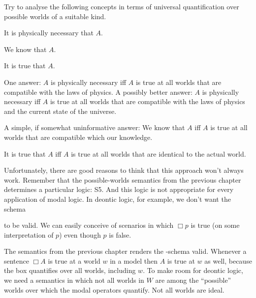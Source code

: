 \begin{exercise}
  Try to analyse the following concepts in terms of universal quantification over possible worlds of a suitable kind.
  \begin{exlist}
    \item It is physically necessary that $A$.
    \item We know that $A$.
    \item It is true that $A$.
  \end{exlist}
\end{exercise}
\begin{solution}
  \begin{sollist}
    \item One answer: $A$ is physically necessary iff $A$ is true at all worlds
    that are compatible with the laws of physics. A possibly better answer: $A$
    is physically necessary iff $A$ is true at all worlds that are compatible
    with the laws of physics and the current state of the universe.
    
    \item A simple, if somewhat uninformative answer: We know that $A$ iff $A$
    is true at all worlds that are compatible which our knowledge.

    \item It is true that $A$ iff $A$ is true at all worlds that are identical
    to the actual world.
  \end{sollist}
\end{solution}

Unfortunately, there are good reasons to think that this approach won't always
work. Remember that the possible-worlds semantics from the previous chapter
determines a particular logic: S5. And this logic is not appropriate for every
application of modal logic. In deontic logic, for example, we don't want the
schema
%
\begin{principles}
\end{principles}
%
to be valid. We can easily conceive of scenarios in which $\Box p$ is true (on
some interpretation of $p$) even though $p$ is false.

The semantics from the previous chapter renders the -schema valid.
Whenever a sentence $\Box A$ is true at a world $w$ in a model then $A$ is true
at $w$ as well, because the box quantifies over all worlds, including $w$. To
make room for deontic logic, we need a semantics in which not all worlds in $W$
are among the ``possible'' worlds over which the modal operators quantify. Not
all worlds are ideal.

